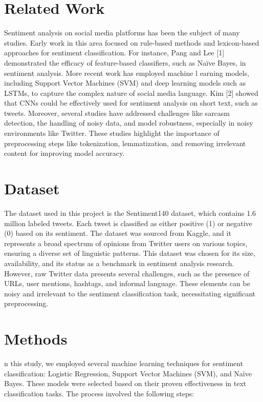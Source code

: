 \documentclass[conference]{IEEEtran}
\begin{document}
\section{Related Work}
Sentiment analysis on social media platforms has been the subject of many studies. Early work in this area 
focused on rule-based methods and lexicon-based approaches for sentiment classification. For instance, Pang and Lee [1] 
demonstrated the efficacy of feature-based classifiers, such as Naïve Bayes, in sentiment analysis. More recent work has employed machine l
earning models, including Support Vector Machines (SVM) and deep learning models such as LSTMs, to capture the complex nature of social media language. Kim [2] showed that CNNs could be effectively used for sentiment analysis on short text, such as tweets. Moreover, several studies have addressed challenges like sarcasm detection, the handling of noisy data, and model robustness, especially in noisy environments like Twitter. These studies highlight the importance of preprocessing steps like tokenization, lemmatization, and removing irrelevant content for improving model accuracy.


\section{Dataset}
The dataset used in this project is the Sentiment140 dataset, which contains 1.6 million labeled tweets. Each tweet is classified as 
either positive (1) or negative (0) based on its sentiment. The dataset was sourced from Kaggle, and it represents a broad spectrum of 
opinions from Twitter users on various topics, ensuring a diverse set of linguistic patterns. This dataset was chosen for its size, availability, 
and its status as a benchmark in sentiment analysis research. However, raw Twitter data presents several challenges, such as the presence of URLs, user mentions, hashtags, and informal language. These elements can be noisy and irrelevant to the sentiment classification task, necessitating significant preprocessing.
\section{Methods}
n this study, we employed several machine learning techniques for sentiment classification: Logistic Regression, Support Vector Machines (SVM),
 and Naïve Bayes. These models were selected based on their proven effectiveness in text classification tasks. The process involved the following steps:
\end{document}
